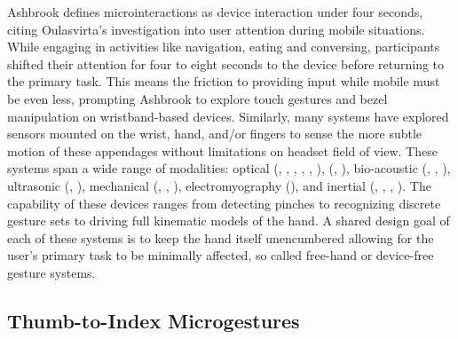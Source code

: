 \documentclass [11pt, proquest] {uwthesis}[2020/02/24]
\begin{document}
Ashbrook defines microinteractions as device interaction under four seconds, citing Oulasvirta's investigation into user attention during mobile situations. While engaging in activities like navigation, eating and conversing, participants shifted their attention for four to eight seconds to the device before returning to the primary task. This means the friction to providing input while mobile must be even less, prompting Ashbrook to explore touch gestures and bezel manipulation on wristband-based devices. Similarly, many systems have explored sensors mounted on the wrist, hand, and/or fingers to sense the more subtle motion of these appendages without limitations on headset field of view. These systems span a wide range of modalities: {optical (\cite{Chatterjee2016TouchPoint:Device}, \cite{Kim2012Digits}, \cite{GestureWristRekimotoTODO get this},
\cite{McIntosh2017SensIR:Reflection}, \cite{Chan2015Cyclopsring:Ring},  \cite{loclair2010pinchwatch}), (\cite{Gong2017Pyro:Sensing}, \cite{thermalring}), bio-acoustic (\cite{10.1145/506443.506566}, \cite{sot}, \cite{fingerping}), 
ultrasonic (\cite{Iravantchi2019BeamBand:Beamforming}, \cite{Zhang2017SoundTrak}), mechanical (\cite{Takada2019AFiber}, \cite{Lin2015BackHand:Hand}, \cite{10.5555/3298830.3298870}), electromyography (\cite{saponas enabling always avialabe input with mci}),
and inertial (\cite{Guy}, \cite{Meier2021TaplD:Sensing}, \cite{Fukumoto1994FingeRing:Interface}, \cite{Liang2021DualRing}).}
The capability of these devices ranges from detecting pinches to recognizing discrete gesture sets to driving full kinematic models of the hand. A shared design goal of each of these systems is to keep the hand itself unencumbered allowing for the user's primary task to be minimally affected, so called free-hand or device-free gesture systems.

\subsection{Thumb-to-Index Microgestures}
\end{document}
